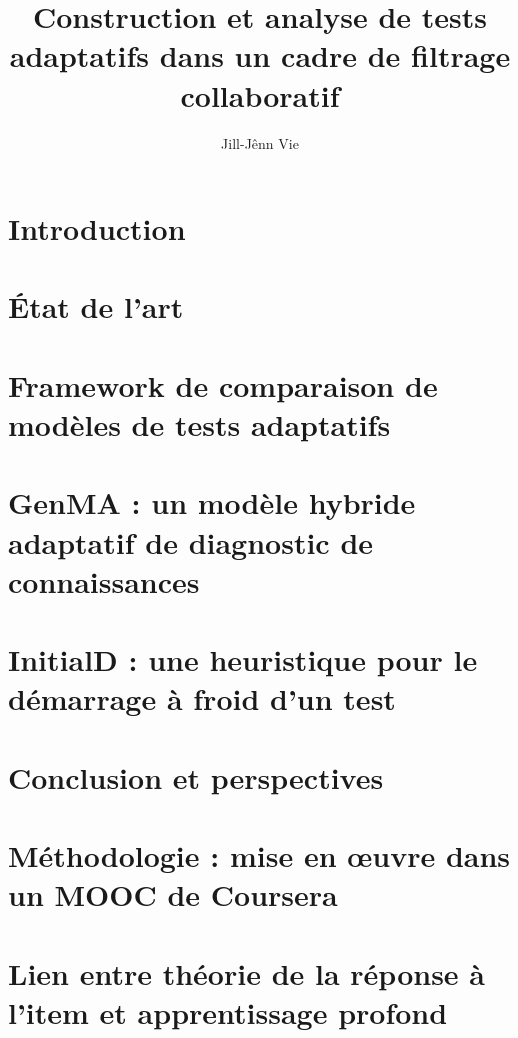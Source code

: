 \documentclass[a4paper,14pt,draft]{memoir}
\title{Construction et analyse de tests adaptatifs dans un cadre de filtrage collaboratif}
\author{Jill-Jênn Vie}
\begin{document}
\maketitle
\clearpage
\tableofcontents

\chapter{Introduction}


\chapter{État de l'art}


\chapter{Framework de comparaison de modèles de tests adaptatifs}



\chapter{GenMA : un modèle hybride adaptatif de diagnostic de connaissances}




\chapter{InitialD : une heuristique pour le démarrage à froid d'un test}




\chapter{Conclusion et perspectives}


\appendix

\chapter{Méthodologie : mise en œuvre dans un MOOC de Coursera}



\chapter{Lien entre théorie de la réponse à l'item et apprentissage profond}


\printbibliography
\end{document}
